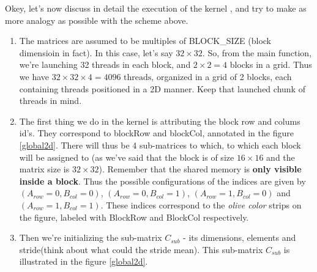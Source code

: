 \documentclass[12pt]{article}
\begin{document}
Okey, let's now discuss in detail the execution of the kernel \verb||, and try to make as more analogy as possible
with the scheme above.
\begin{enumerate}
   \item The matrices are assumed to be multiples of BLOCK\_SIZE (block dimensioin in fact). In this case, let's say $32\times 32$. So, 
   from the main function, we're launching 32 threads in each block, and $2\times 2 = 4$ blocks in a grid. Thus we have 
   $32\times 32\times 4=4096 \text{ threads}$, organized in a grid of 2 blocks, each containing threads 
   positioned in a 2D manner. Keep that launched chunk of threads in mind. 
   \item The first thing we do in the kernel is attributing the block row and colums id's. They correspond to blockRow and blockCol, 
   annotated in the figure \ref{global2d}. There will thus be 4 sub-matrices to which, to which each block will be assigned to (as we've said 
   that the block is of size $16\times 16$ and the matrix size is $32\times 32$). Remember that
   the shared memory is \textbf{only visible inside a block}. Thus the possible configurations of the indices are given by 
   $(A_{row}=0, B_{col}=0)$, $(A_{row}=0, B_{col}=1)$, $(A_{row}=1, B_{col}=0)$ and $(A_{row}=1, B_{col}=1)$. These indices correspond to the 
   \textit{olive color} strips on the figure, labeled with BlockRow and BlockCol respectively.
   \item Then we're initializing the sub-matrix $C_{sub}$ - its dimensions, elements and stride(think about what 
   could the stride mean). This sub-matrix $C_{sub}$ is illustrated in the figure \ref{global2d}. 



\end{enumerate}
\end{document}

